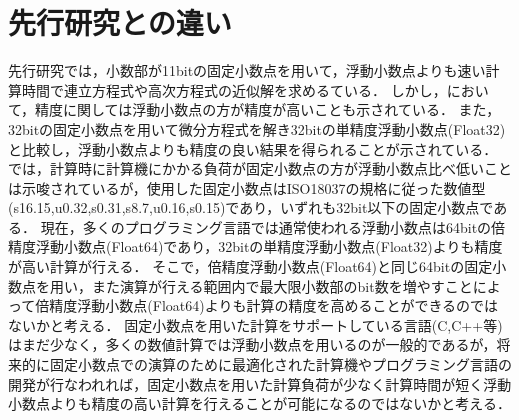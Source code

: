 \section{先行研究との違い}
先行研究では，小数部が11bitの固定小数点を用いて，浮動小数点よりも速い計算時間で連立方程式や高次方程式の近似解を求めるている\cite{IJERTV12IS010134}．
しかし，\cite{IJERTV12IS010134}において，精度に関しては浮動小数点の方が精度が高いことも示されている．
また，32bitの固定小数点を用いて微分方程式を解き32bitの単精度浮動小数点(Float32)と比較し，浮動小数点よりも精度の良い結果を得られることが示されている\cite{hopkins2020stochastic}．
\cite{hopkins2020stochastic}では，計算時に計算機にかかる負荷が固定小数点の方が浮動小数点比べ低いことは示唆されているが，使用した固定小数点はISO18037の規格に従った数値型(s16.15,u0.32,s0.31,s8.7,u0.16,s0.15)であり，いずれも32bit以下の固定小数点である．
現在，多くのプログラミング言語では通常使われる浮動小数点は64bitの倍精度浮動小数点(Float64)であり，32bitの単精度浮動小数点(Float32)よりも精度が高い計算が行える．
そこで，倍精度浮動小数点(Float64)と同じ64bitの固定小数点を用い，また演算が行える範囲内で最大限小数部のbit数を増やすことによって倍精度浮動小数点(Float64)よりも計算の精度を高めることができるのではないかと考える．
固定小数点を用いた計算をサポートしている言語(C,C++等)はまだ少なく，多くの数値計算では浮動小数点を用いるのが一般的であるが，将来的に固定小数点での演算のために最適化された計算機やプログラミング言語の開発が行なわれれば，固定小数点を用いた計算負荷が少なく計算時間が短く浮動小数点よりも精度の高い計算を行えることが可能になるのではないかと考える．